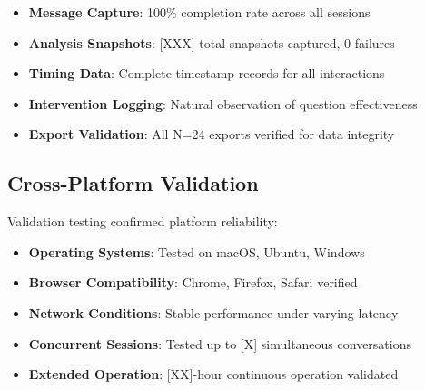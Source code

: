 \documentclass[11pt,letterpaper]{article}
\newcommand{\exponedataTotalSessionsRaw}{24}
\newcommand{\exponedataTotalSessions}{N=\exponedataTotalSessionsRaw}
\begin{document}
\begin{itemize}
    \item \textbf{Message Capture}: 100\% completion rate across all sessions
    \item \textbf{Analysis Snapshots}: [XXX] total snapshots captured, 0 failures
    \item \textbf{Timing Data}: Complete timestamp records for all interactions
    \item \textbf{Intervention Logging}: Natural observation of question effectiveness
    \item \textbf{Export Validation}: All \exponedataTotalSessions{} exports verified for data integrity
\end{itemize}

\subsection{Cross-Platform Validation}

Validation testing confirmed platform reliability:

\begin{itemize}
    \item \textbf{Operating Systems}: Tested on macOS, Ubuntu, Windows
    \item \textbf{Browser Compatibility}: Chrome, Firefox, Safari verified
    \item \textbf{Network Conditions}: Stable performance under varying latency
    \item \textbf{Concurrent Sessions}: Tested up to [X] simultaneous conversations
    \item \textbf{Extended Operation}: [XX]-hour continuous operation validated
\end{itemize}
\end{document}
